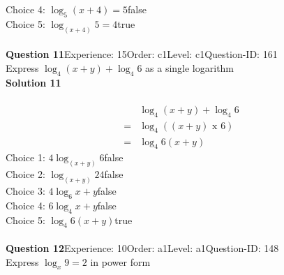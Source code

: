 \documentclass{article}
\begin{document}
Choice 4: \hspace{20pt}$\log_{5}(x+4)=5$\hspace{20pt}false\\
Choice 5: \hspace{20pt}$\log_{(x+4)}5=4$\hspace{20pt}true\\
\\[4pt]
\noindent\textbf{Question 11}\hspace{20pt}Experience: 15\hspace{20pt}Order: c1\hspace{20pt}Level: c1\hspace{20pt}Question-ID: 161\\[2pt]
Express $\log_{4}(x+y)+\log_{4}6$ as a single logarithm\\[4pt]
\noindent\textbf{Solution 11}\\[2pt]
\\[-35pt]\begin{align*}
&\log_{4}(x+y)+\log_{4}6\\[2pt]
=&\log_{4}((x+y) \,\, \text{x} \,\, 6)\\[2pt]
=&\log_{4}6(x+y)
\end{align*}
Choice 1: \hspace{20pt}$4\log_{(x+y)}6$\hspace{20pt}false\\
Choice 2: \hspace{20pt}$\log_{(x+y)}24$\hspace{20pt}false\\
Choice 3: \hspace{20pt}$4\log_{6}x+y$\hspace{20pt}false\\
Choice 4: \hspace{20pt}$6\log_{4}x+y$\hspace{20pt}false\\
Choice 5: \hspace{20pt}$\log_{4}6(x+y)$\hspace{20pt}true\\
\\[4pt]
\noindent\textbf{Question 12}\hspace{20pt}Experience: 10\hspace{20pt}Order: a1\hspace{20pt}Level: a1\hspace{20pt}Question-ID: 148\\[2pt]
Express $\log_x9=2$ in power form\\[4pt]
\end{document}
